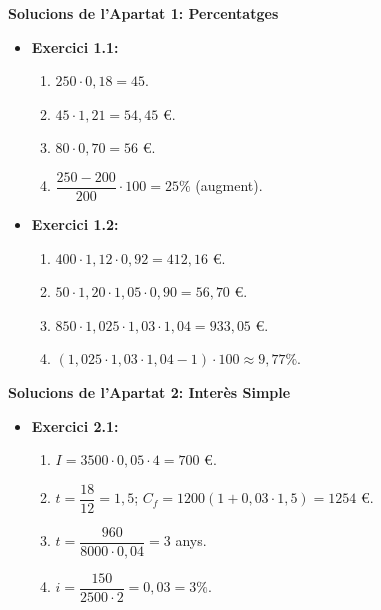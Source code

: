 \documentclass[12pt]{article}
\begin{document}
\begin{solucio}
\textbf{Solucions de l'Apartat 1: Percentatges}
\begin{itemize}
    \item \textbf{Exercici 1.1:}
    \begin{enumerate}[label=\alph*)]
        \item $250 \cdot 0{,}18 = 45$.
        \item $45 \cdot 1{,}21 = 54{,}45$ €.
        \item $80 \cdot 0{,}70 = 56$ €.
        \item $\dfrac{250-200}{200} \cdot 100 = 25\%$ (augment).
    \end{enumerate}
    \item \textbf{Exercici 1.2:}
    \begin{enumerate}[label=\alph*)]
        \item $400 \cdot 1{,}12 \cdot 0{,}92 = 412{,}16$ €.
        \item $50 \cdot 1{,}20 \cdot 1{,}05 \cdot 0{,}90 = 56{,}70$ €.
        \item $850 \cdot 1{,}025 \cdot 1{,}03 \cdot 1{,}04 = 933{,}05$ €.
        \item $(1{,}025 \cdot 1{,}03 \cdot 1{,}04 - 1) \cdot 100 \approx 9{,}77\%$.
    \end{enumerate}
\end{itemize}
\end{solucio}

\begin{solucio}
\textbf{Solucions de l'Apartat 2: Interès Simple}
\begin{itemize}
    \item \textbf{Exercici 2.1:}
    \begin{enumerate}[label=\alph*)]
        \item $I = 3500 \cdot 0{,}05 \cdot 4 = 700$ €.
        \item $t = \dfrac{18}{12} = 1{,}5$; $C_f = 1200(1 + 0{,}03 \cdot 1{,}5) = 1254$ €.
        \item $t = \dfrac{960}{8000 \cdot 0{,}04} = 3$ anys.
        \item $i = \dfrac{150}{2500 \cdot 2} = 0{,}03 = 3\%$.
    \end{enumerate}
\end{itemize}
\end{solucio}
\end{document}
